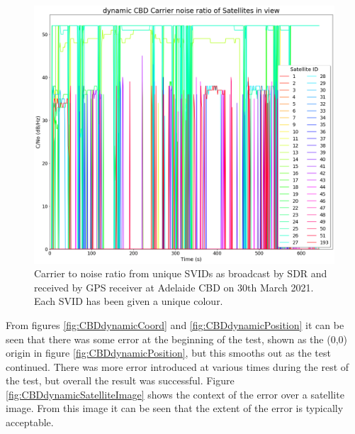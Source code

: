 \begin{figure}[H]
    \begin{centering}
        \includegraphics[width=12cm,keepaspectratio]{Figures/21_3_30_dynamic_CBD_results Carrier noise ratio.png}
        \caption{Carrier to noise ratio from unique SVIDs as broadcast by SDR and received by GPS receiver at Adelaide CBD on 30th March 2021. Each SVID has been given a unique colour.}
        \label{fig:CBDdynamicCNo}
    \end{centering}
\end{figure}

From figures \ref{fig:CBDdynamicCoord} and \ref{fig:CBDdynamicPosition} it can be seen that there was some error at the beginning of the test, shown as the (0,0) origin
in figure \ref{fig:CBDdynamicPosition}, but this smooths out as the test continued. There was more error introduced at various times during the rest of the test, but
overall the result was successful. Figure \ref{fig:CBDdynamicSatelliteImage} shows the context of the error over a satellite image. From this image it can be seen that the
extent of the error is typically acceptable.

